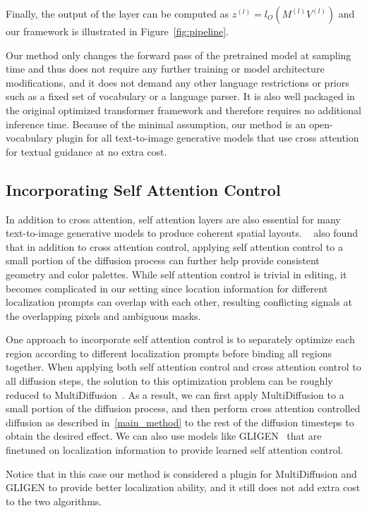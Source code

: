 Finally, the output of the layer can be computed as $ z^{(l)} = l_O(M^{(l)}V^{(l)})$ and our framework is illustrated in Figure~\ref{fig:pipeline}.

Our method only changes the forward pass of the pretrained model at sampling time and thus does not require any further training or model architecture modifications, and it does not demand any other language restrictions or priors such as a fixed set of vocabulary or a language parser. It is also well packaged in the original optimized transformer framework and therefore requires no additional inference time. Because of the minimal assumption, our method is an {open-vocabulary plugin for all} text-to-image generative models that use cross attention for textual guidance {at no extra cost}.

\subsection{Incorporating Self Attention Control}

In addition to cross attention, self attention layers are also essential for many text-to-image generative models to produce coherent spatial layouts. ~\citet{prompt2prompt} also found that in addition to cross attention control, applying self attention control to a small portion of the diffusion process can further help provide consistent geometry and color palettes. While self attention control is trivial in editing, it becomes complicated in our setting since location information for different localization prompts can overlap with each other, resulting conflicting signals at the overlapping pixels and ambiguous masks.


One approach to incorporate self attention control is to separately optimize each region according to different localization prompts before binding all regions together. When applying both self attention control and cross attention control to all diffusion steps, the solution to this optimization problem can be roughly reduced to MultiDiffusion~\citep{multidiffusion}. As a result, we can first apply MultiDiffusion to a small portion of the diffusion process, and then perform cross attention controlled diffusion as described in~\ref{main_method} to the rest of the diffusion timesteps to obtain the desired effect.  We can also use models like GLIGEN~\citep{gligen} that are finetuned on localization information to provide learned self attention control.

Notice that in this case our method is considered a plugin for MultiDiffusion and GLIGEN to provide better localization ability, and it still does not add extra cost to the two algorithms.
